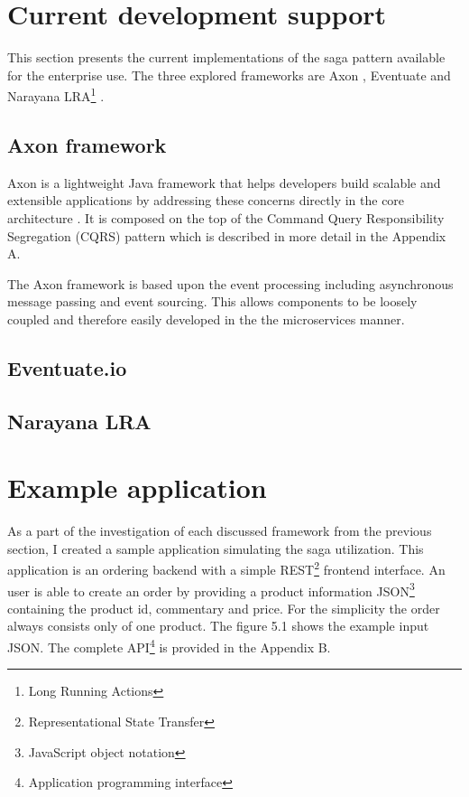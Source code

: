 \documentclass[oneside,
  digital, %
  table,   %
  nolof,     %
  nolot,     %
]{fithesis3}
\begin{document}
\section{Current development support}

This section presents the current implementations of the saga pattern available for the enterprise use. The three explored frameworks are Axon \cite{axon_framework}, Eventuate \cite{eventuate.io} and Narayana LRA\footnote{Long Running Actions} \cite{narayana_lra}.

\subsection{Axon framework}

Axon is a lightweight Java framework that helps developers build scalable and extensible applications by addressing these concerns directly in the core  architecture \cite{axon_framework}. It is composed on the top of the Command Query Responsibility Segregation (CQRS) pattern which is described in more detail in the Appendix A.

The Axon framework is based upon the event processing including asynchronous message passing and event sourcing. This allows components to be loosely coupled and therefore easily developed in the the microservices manner.

\subsection{Eventuate.io}

\subsection{Narayana LRA}

\section{Example application}

As a part of the investigation of each discussed framework from the previous section, I created a sample application simulating the saga utilization. This application is an ordering backend with a simple REST\footnote{Representational State Transfer} frontend interface. An user is able to create an order by providing a product information JSON\footnote{JavaScript object notation} containing the product id, commentary and price. For the simplicity the order always consists only of one product. The figure 5.1 shows the example input JSON. The complete API\footnote{Application programming interface} is provided in the Appendix B.
\end{document}
